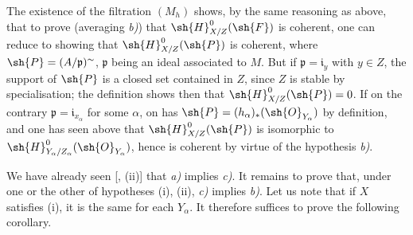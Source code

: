 \begin{proposition}[5.11.1]
The existence of the filtration $(M_h)$ shows, by the same reasoning as above, that to prove (averaging \emph{b)}) that $\sh{H}^0_{X/Z}(\sh{F})$ is coherent, one can reduce to showing that $\sh{H}^0_{X/Z}(\sh{P})$ is coherent, where $\sh{P}=(A/\mathfrak{p})^\sim$, $\mathfrak{p}$ being an ideal associated to $M$.
But if $\mathfrak{p}=\mathfrak{i}_y$ with $y\in Z$, the support of $\sh{P}$ is a closed set contained in $Z$, since $Z$ is stable by specialisation; the definition  shows then that $\sh{H}^0_{X/Z}(\sh{P})=0$.
If on the contrary $\mathfrak{p}=\mathfrak{i}_{x_\alpha}$ for some $\alpha$, on has $\sh{P}=(h_\alpha)_*(\sh{O}_{Y_\alpha})$ by definition, and one has seen above that $\sh{H}^0_{X/Z}(\sh{P})$ is isomorphic to $\sh{H}^0_{Y_\alpha/Z_\alpha}(\sh{O}_{Y_\alpha})$, hence is coherent by virtue of the hypothesis \emph{b)}.

We have already seen [, (ii)] that \emph{a)} implies \emph{c)}.
It remains to prove that, under one or the other of hypotheses (i), (ii), \emph{c)} implies \emph{b)}.
Let us note that if $X$ satisfies (i), it is the same for each $Y_\alpha$.
It therefore suffices  to prove the following corollary.
\end{proposition}

